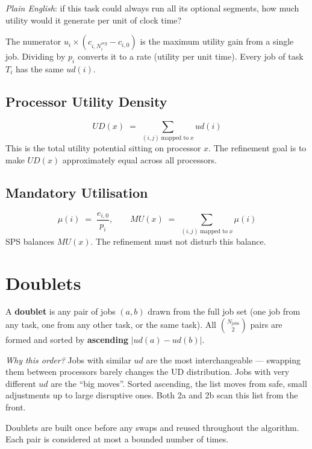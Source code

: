 \documentclass[10pt,twocolumn]{article}
\begin{document}
\noindent\textit{Plain English}: if this task could always run all its optional
segments, how much utility would it generate per unit of clock time?

The numerator $u_i \times (c_{i,N_i^{seg}} - c_{i,0})$ is the maximum utility
gain from a single job. Dividing by $p_i$ converts it to a rate (utility per
unit time). Every job of task $T_i$ has the same $ud(i)$.

\subsection{Processor Utility Density}
\[
  UD(x) \;=\; \sum_{(i,j)\;\text{mapped to}\;x} ud(i)
\]
This is the total utility potential sitting on processor $x$. The refinement
goal is to make $UD(x)$ approximately equal across all processors.

\subsection{Mandatory Utilisation}
\[
  \mu(i) \;=\; \frac{e_{i,0}}{p_i}, \qquad
  MU(x) \;=\; \sum_{(i,j)\;\text{mapped to}\;x} \mu(i)
\]
SPS balances $MU(x)$. The refinement must not disturb this balance.

\section{Doublets}

A \textbf{doublet} is any pair of jobs $(a, b)$ drawn from the full job set
(one job from any task, one from any other task, or the same task).
All $\binom{N_{\text{jobs}}}{2}$ pairs are formed and sorted by
\textbf{ascending} $|ud(a) - ud(b)|$.

\begin{graybox}
\textit{Why this order?} Jobs with similar $ud$ are the most interchangeable
--- swapping them between processors barely changes the UD distribution.
Jobs with very different $ud$ are the ``big moves''. Sorted ascending,
the list moves from safe, small adjustments up to large disruptive ones.
Both 2a and 2b scan this list from the front.
\end{graybox}

Doublets are built once before any swaps and reused throughout the algorithm.
Each pair is considered at most a bounded number of times.

\end{document}

